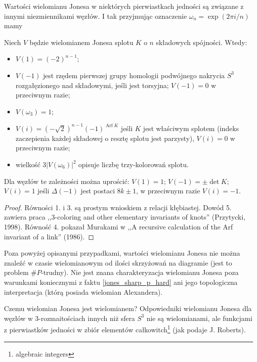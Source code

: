 Wartości wielomianu Jonesa w niektórych pierwiastkach jedności są związane z innymi niezmiennikami węzłów.
I tak przyjmując oznaczenie $\omega_n = \exp(2\pi i/n)$ mamy

\begin{proposition} \label{jones_sharp_p_hard}
	Niech $V$ będzie wielomianem Jonesa splotu $K$ o $n$ składowych spójności.
	Wtedy:
	\begin{itemize}
		\item $V(1) = (-2)^{n-1}$;
		\item $V(-1)$ jest rzędem pierwszej grupy homologii podwójnego nakrycia $S^3$ rozgałęzionego nad składowymi, jeśli jest torsyjna; $V(-1) = 0$ w przeciwnym razie;
		\item $V(\omega_3) = 1$;
		\item $V(i) = (-\sqrt 2)^{n-1}(-1)^{\operatorname{Arf} K}$ jeśli $K$ jest właściwym splotem (indeks zaczepienia każdej składowej o resztę splotu jest parzysty), $V(i) = 0$ w przeciwnym razie;
		\item wielkość $3|V(\omega_6)|^2$ opisuje liczbę trzy-kolorowań splotu.
	\end{itemize}
	Dla węzłów te zależności można uprościć: $V(1) = 1$; $V(-1) = \pm \det K$; $V(i) = 1$ jeśli $\Delta(-1)$ jest postaci $8k \pm 1$, w przeciwnym razie $V(i) = -1$.
\end{proposition}

\begin{proof}
	Równości 1. i 3. są prostym wnioskiem z relacji kłębiastej.
	Dowód 5. zawiera praca ,,3-coloring and other elementary invariants of knots'' (Przytycki, 1998).
	Równość 4. pokazał Murakami w ,,A recursive calculation of the Arf invariant of a link'' (1986).
\end{proof}

Poza powyżej opisanymi przypadkami, wartości wielomianu Jonesa nie można znaleźć w czasie wielomianowym od ilości skrzyżowań na diagramie (jest to problem $\#P$-trudny).
Nie jest znana charakteryzacja wielomianu Jonesa poza warunkami koniecznymi z faktu \ref{jones_sharp_p_hard} ani jego topologiczna interpretacja (którą posiada wielomian Alexandera).

Czemu wielomian Jonesa jest wielomianem?
Odpowiedniki wielomianu Jonesa dla węzłów w 3-rozmaitościach innych niż sfera $S^3$ nie są wielomianami, ale funkcjami z pierwiastków jedności w zbiór elementów całkowitch\footnote{algebraic integers} (jak podaje J. Roberts).

